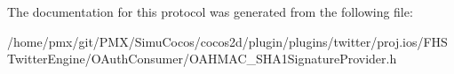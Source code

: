 The documentation for this protocol was generated from the following file\+:\begin{DoxyCompactItemize}
\item 
/home/pmx/git/\+P\+M\+X/\+Simu\+Cocos/cocos2d/plugin/plugins/twitter/proj.\+ios/\+F\+H\+S\+Twitter\+Engine/\+O\+Auth\+Consumer/O\+A\+H\+M\+A\+C\+\_\+\+S\+H\+A1\+Signature\+Provider.\+h\end{DoxyCompactItemize}
